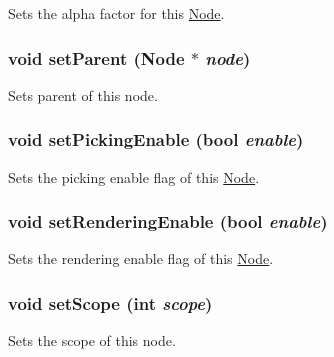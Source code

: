 Sets the alpha factor for this \hyperlink{classm3g_1_1Node}{Node}. \hypertarget{classm3g_1_1Node_880ecc7c1c091f7607eeae12ed100a9a}{
\subsubsection[{setParent}]{\setlength{\rightskip}{0pt plus 5cm}void setParent ({\bf Node} $\ast$ {\em node})}}
\label{classm3g_1_1Node_880ecc7c1c091f7607eeae12ed100a9a}


Sets parent of this node. \hypertarget{classm3g_1_1Node_4f9296202713ac56ccae72d5e0c21d96}{
\subsubsection[{setPickingEnable}]{\setlength{\rightskip}{0pt plus 5cm}void setPickingEnable (bool {\em enable})}}
\label{classm3g_1_1Node_4f9296202713ac56ccae72d5e0c21d96}


Sets the picking enable flag of this \hyperlink{classm3g_1_1Node}{Node}. \hypertarget{classm3g_1_1Node_58981ef7aea1bf0e630bcc065b2987e9}{
\subsubsection[{setRenderingEnable}]{\setlength{\rightskip}{0pt plus 5cm}void setRenderingEnable (bool {\em enable})}}
\label{classm3g_1_1Node_58981ef7aea1bf0e630bcc065b2987e9}


Sets the rendering enable flag of this \hyperlink{classm3g_1_1Node}{Node}. \hypertarget{classm3g_1_1Node_55f324f307a01705b9094a73af4ecd68}{
\subsubsection[{setScope}]{\setlength{\rightskip}{0pt plus 5cm}void setScope (int {\em scope})}}
\label{classm3g_1_1Node_55f324f307a01705b9094a73af4ecd68}


Sets the scope of this node. 


